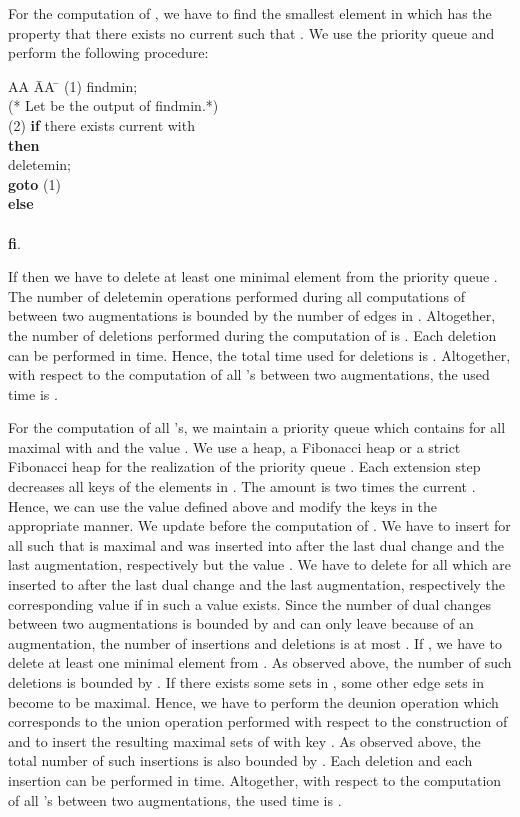 \documentclass[12pt,twoside,a4paper]{article}
\begin{document}
For the computation of , we have to find the smallest element
 in  which has the property that there exists no current 
such that . We use the priority queue  and
perform the following procedure:

\begin{tabbing}
AA \= AA \= \kill
(1) findmin; \\ 
\> (* Let  be the output of findmin.*) \\
(2) {\bf if} there exists  current with  \\
\> {\bf then} \\
\> \> deletemin; \\
\> \> {\bf goto} (1) \\
\> {\bf else} \\ 
\> \>  \\
\> {\bf fi}.
\end{tabbing}

If  then we have to delete at least one minimal
element from the priority queue . The number of deletemin operations
performed during all computations of  between two augmentations is bounded by 
the number of edges in .
Altogether, the number of deletions performed during the computation of
 is . Each deletion can be performed in  time.
Hence, the total time used for deletions is .
Altogether, with respect to the computation of all 's between two
augmentations, the used time is .

For the computation of all 's, we maintain a priority queue 
 which contains for all maximal  with  and  the value .
We use a heap, a Fibonacci heap or a strict Fibonacci heap for the realization of 
the priority queue .
Each extension step decreases all keys of the elements in . The amount
is two times the current . Hence, we can use the value 
defined above and modify the keys in the appropriate manner.
We update  before the computation of . We have to insert 
for all  such that  is maximal and  was inserted 
into  after the last dual change and the last augmentation, respectively 
but  the value . 
We have to delete for all  which are inserted to 
after the last dual change and the last augmentation, respectively 
the corresponding value if in  such a value exists. 
Since the number of dual changes between two augmentations is bounded by  and
 can only leave  because of an augmentation, the number
of insertions and deletions is at most . 
If , we have to delete at least one minimal
element from . As observed above, the number of such deletions is
bounded by . If there exists some sets  in ,
some other edge sets in  become to be maximal. Hence, we have to perform
the deunion operation which corresponds to the union operation performed with
respect to the construction of  and to insert the resulting maximal sets  of
 with key . As observed above, the total number of such 
insertions is also bounded by . 
Each deletion and each insertion can be performed in  time.
Altogether, with respect to the computation of all 's between two
augmentations, the used time is .
\end{document}
